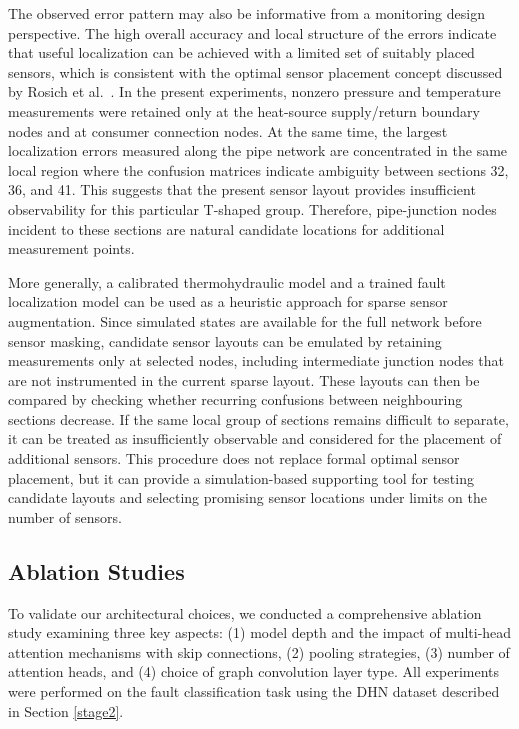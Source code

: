 \documentclass[energies,article,submit,pdftex,moreauthors]{Definitions/mdpi}
\newif\ifshowrevisions
\newcommand{\revisionstyle}[1]{\textcolor{blue}{#1}}
\newcommand{\revision}[1]{\ifshowrevisions\revisionstyle{#1}\else#1\fi}
\begin{document}
The observed error pattern may also be informative from a monitoring design perspective. The high overall accuracy and local structure of the errors indicate that useful localization can be achieved with a limited set of suitably placed sensors, which is consistent with the optimal sensor placement concept discussed by Rosich et al.~\cite{rosich2012optimal}. In the present experiments, nonzero pressure and temperature measurements were retained only at the heat-source supply/return boundary nodes and at consumer connection nodes. At the same time, the largest localization errors measured along the pipe network are concentrated in the same local region where the confusion matrices indicate ambiguity between sections 32, 36, and 41. This suggests that the present sensor layout provides insufficient observability for this particular T-shaped group. Therefore, pipe-junction nodes incident to these sections are natural candidate locations for additional measurement points.

More generally, a calibrated thermohydraulic model and a trained fault localization model can be used as a heuristic approach for sparse sensor augmentation. Since simulated states are available for the full network before sensor masking, candidate sensor layouts can be emulated by retaining measurements only at selected nodes, including intermediate junction nodes that are not instrumented in the current sparse layout. These layouts can then be compared by checking whether recurring confusions between neighbouring sections decrease. If the same local group of sections remains difficult to separate, it can be treated as insufficiently observable and considered for the placement of additional sensors. This procedure does not replace formal optimal sensor placement, but it can provide a simulation-based supporting tool for testing candidate layouts and selecting promising sensor locations under limits on the number of sensors.

\subsection{Ablation Studies}

To validate our architectural choices, we conducted a comprehensive ablation
study examining three key aspects: (1) model depth and the impact of multi-head
attention mechanisms with skip connections, (2) pooling strategies, (3) number
of attention heads, and (4) choice of graph convolution layer type. All
experiments were performed on the fault classification task using the DHN
dataset described in Section \ref{stage2}.
\end{document}
